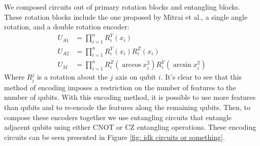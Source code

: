 \documentclass[journal=jacsat,manuscript=article]{achemso}
\begin{document}
We composed circuits out of primary rotation blocks and entangling blocks. These rotation blocks include the one proposed by Mitrai et al.\cite{mitarai_quantum_2018}, a single angle rotation, and a double rotation encoder:
\begin{align}
    U_{A1} &= \prod_{i=1}^n R^Y_i(x_i) \\
    U_{A2} &= \prod_{i=1}^n R^Y_i(x_i) R^Z_i(x_i) \\
    U_{M}  &= \prod_{i=1}^n R^Z_i(\arccos x_i^2) R^Y_i(\arcsin x_i^2)
\end{align}
Where $R^j_i$ is a rotation about the $j$ axis on qubit $i$. It's clear to see that this method of encoding imposes a restriction on the number of features to the number of qubits. With this encoding method, it is possible to use more features than qubits and to re-encode the features along the remaining qubits. Then, to compose these encoders together we use entangling circuits that entangle adjacent qubits using either CNOT or CZ entangling operations. These encoding circuits can be seen presented in Figure \ref{fig: idk circuits or something}. 
\end{document}
